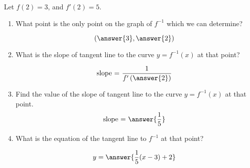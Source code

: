 \documentclass{ximera}
\author{Steven Gubkin}
\begin{document}
\begin{exercise}

Let $f(2)=3$, and $f'(2) = 5$. 
\begin{enumerate}
\item What point is the only  point on the graph of $f^{-1}$ which we can determine?

\[
\left(\answer{3},\answer{2}\right)
\]
\item What is the slope of tangent line to the curve $y=f^{-1}(x)$ at that point?

\[
\text{slope = }\frac{1}{f'\left(\answer{2}\right)}
\]
\item Find the value of the slope of tangent line to the curve $y=f^{-1}(x)$ at that point.
\[
\text{slope = }\answer{\frac{1}{5}}
\]
  \item What is the equation of the tangent line to $f^{-1}$ at that point?
\begin{prompt}
\[
y = \answer{\frac{1}{5}(x-3)+2}
\]
\end{prompt}
\end{enumerate}
\end{exercise}
\end{document}
